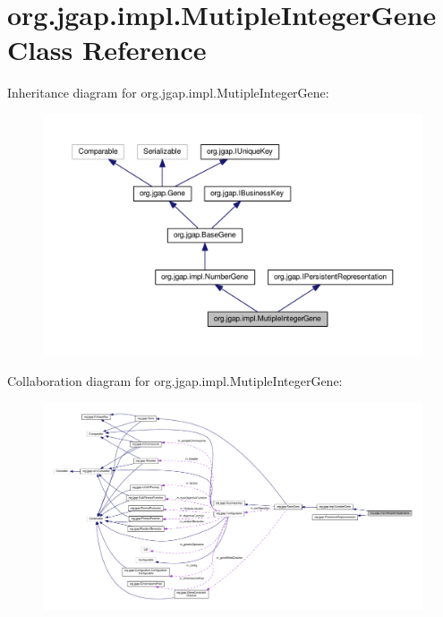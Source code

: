 \hypertarget{classorg_1_1jgap_1_1impl_1_1_mutiple_integer_gene}{\section{org.\-jgap.\-impl.\-Mutiple\-Integer\-Gene Class Reference}
\label{classorg_1_1jgap_1_1impl_1_1_mutiple_integer_gene}
}


Inheritance diagram for org.\-jgap.\-impl.\-Mutiple\-Integer\-Gene\-:
\nopagebreak
\begin{figure}[H]
\begin{center}
\leavevmode
\includegraphics[width=350pt]{classorg_1_1jgap_1_1impl_1_1_mutiple_integer_gene__inherit__graph}
\end{center}
\end{figure}


Collaboration diagram for org.\-jgap.\-impl.\-Mutiple\-Integer\-Gene\-:
\nopagebreak
\begin{figure}[H]
\begin{center}
\leavevmode
\includegraphics[width=350pt]{classorg_1_1jgap_1_1impl_1_1_mutiple_integer_gene__coll__graph}
\end{center}
\end{figure}
